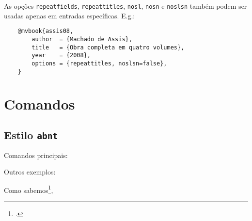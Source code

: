 \documentclass[a4paper]{article}
\begin{document}
As opções \texttt{repeatfields}, \texttt{repeattitles}, \texttt{nosl},
\texttt{nosn} e \texttt{noslsn} também podem ser usadas apenas em entradas
específicas. E.g.:

\begin{verbatim}
    @mvbook{assis08,
        author  = {Machado de Assis},
        title   = {Obra completa em quatro volumes},
        year    = {2008},
        options = {repeattitles, noslsn=false},
    }
\end{verbatim}

\clearpage
\section{Comandos}%
\label{sec:comandos}

\subsection{Estilo \texttt{abnt}}%

Comandos principais:

\begin{example}
\cite{amaral15}
\end{example}

\begin{example}
\textcite{bosi08}
\end{example}

\begin{example}
\end{example}

\begin{example}
\cites{moretti09}{mann09}{amaral15}
\end{example}

\begin{example}
\textcites{moretti09}{mann09}{amaral15}
\end{example}

Outros exemplos:

\begin{example}
Como sabemos\footcite[Cf.][]{assis08},
\end{example}

\begin{example}
\end{example}

\begin{example}
\citeauthor{bosi08}
\end{example}

\begin{example}
\citeyear{bosi08}
\end{example}
\end{document}
